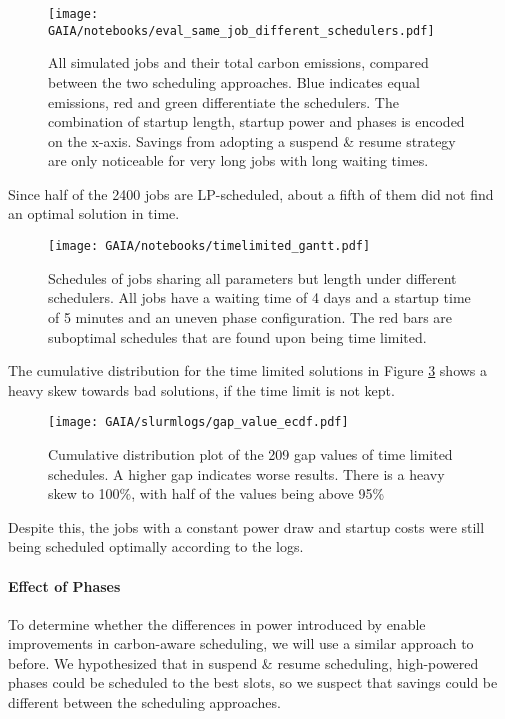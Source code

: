 \begin{figure}[H]
    \texttt{[image: GAIA/notebooks/eval\_same\_job\_different\_schedulers.pdf]}
    \caption[short]{All simulated jobs and their total carbon emissions, compared between the two scheduling approaches. Blue indicates equal emissions, red and green differentiate the schedulers. The combination of startup length, startup power and phases is encoded on the x-axis. Savings from adopting a suspend \& resume strategy are only noticeable for very long jobs with long waiting times.}
    \label{fig:eval_different_schedulers}
\end{figure}

Since half of the 2400 jobs are LP-scheduled, about a fifth of them did not find an optimal solution in time.

\begin{figure}[H]
    \texttt{[image: GAIA/notebooks/timelimited\_gantt.pdf]}
    \caption[short]{Schedules of jobs sharing all parameters but length under different schedulers. All jobs have a waiting time of 4 days and a startup time of 5 minutes and an uneven phase configuration. The red bars are suboptimal schedules that are found upon being time limited.}
    \label{fig:timelimited_gantt}
\end{figure}

The cumulative distribution for the time limited solutions in Figure \ref{fig:ecdf_gap} shows a heavy skew towards bad solutions, if the time limit is not kept.

\begin{figure}[H]
    \texttt{[image: GAIA/slurmlogs/gap\_value\_ecdf.pdf]}
    \caption[short]{Cumulative distribution plot of the 209 gap values of time limited schedules. A higher gap indicates worse results. There is a heavy skew to 100\%, with half of the values being above 95\%}
    \label{fig:ecdf_gap}
\end{figure}

Despite this, the jobs with a constant power draw and startup costs were still being scheduled optimally according to the logs. 

\paragraph{Effect of Phases}

To determine whether the differences in power introduced by \modelname{} enable improvements in carbon-aware scheduling, we will use a similar approach to before. We hypothesized that in suspend \& resume scheduling, high-powered phases could be scheduled to the best slots, so we suspect that savings could be different between the scheduling approaches. 

